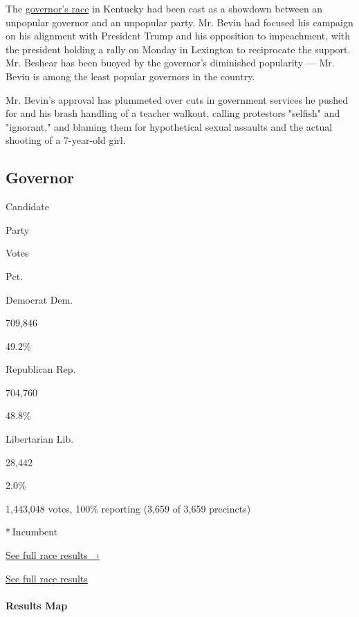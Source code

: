 The
\href{https://www.nytimes3xbfgragh.onion/2019/10/29/us/politics/matt-bevin-andy-beshear-kentucky-governor.html}{governor's
race} in Kentucky had been cast as a showdown between an unpopular
governor and an unpopular party. Mr. Bevin had focused his campaign on
his alignment with President Trump and his opposition to impeachment,
with the president holding a rally on Monday in Lexington to reciprocate
the support. Mr. Beshear has been buoyed by the governor's diminished
popularity --- Mr. Bevin is among the least popular governors in the
country.

Mr. Bevin's approval has plummeted over cuts in government services he
pushed for and his brash handling of a teacher walkout, calling
protestors "selfish" and "ignorant," and blaming them for hypothetical
sexual assaults and the actual shooting of a 7-year-old girl.

\hypertarget{governor}{%
\subsection{Governor}\label{governor}}

Candidate

Party

Votes

Pct.

Democrat Dem.

709,846

49.2\%

Republican Rep.

704,760

48.8\%

Libertarian Lib.

28,442

2.0\%

1,443,048 votes, 100\% reporting (3,659 of 3,659 precincts)

* Incumbent

\href{https://www.nytimes3xbfgragh.onion/interactive/2019/11/05/us/elections/results-kentucky-governor-general-election.html}{See
full race results ~›}

\href{https://www.nytimes3xbfgragh.onion/interactive/2019/11/05/us/elections/results-kentucky-governor-general-election.html}{See
full race results }

\hypertarget{results-map}{%
\paragraph{Results Map}\label{results-map}}

